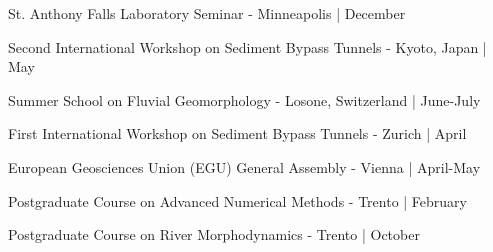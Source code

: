  St. Anthony Falls Laboratory Seminar - Minneapolis | December
\sectionsep

 Second International Workshop on Sediment Bypass Tunnels - Kyoto, Japan | May
\sectionsep

 Summer School on Fluvial Geomorphology - Losone, Switzerland | June-July
\sectionsep

\sectionsep

 First International Workshop on Sediment Bypass Tunnels - Zurich | April
\sectionsep

 European Geosciences Union (EGU) General Assembly - Vienna | April-May
\sectionsep

 Postgraduate Course on Advanced Numerical Methods - Trento | February
\sectionsep

 Postgraduate Course on River Morphodynamics - Trento | October
\sectionsep
